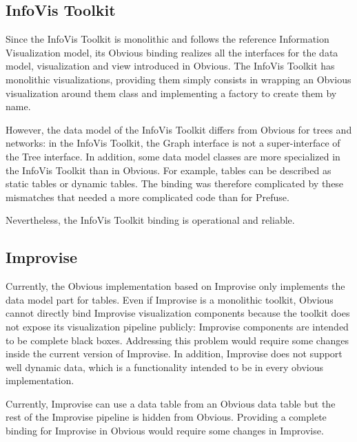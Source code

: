 
\subsection{InfoVis Toolkit}

Since the InfoVis Toolkit is monolithic and follows the reference
Information Visualization model, its Obvious binding realizes all the
interfaces for the data model, visualization and view introduced in
Obvious. The InfoVis Toolkit has monolithic visualizations, providing
them simply consists in wrapping an Obvious visualization around them
class and implementing a factory to create them by name.

However, the data model of the InfoVis Toolkit differs from Obvious
for trees and networks: in the InfoVis Toolkit, the Graph interface is
not a super-interface of the Tree interface.  In addition, some data
model classes are more specialized in the InfoVis Toolkit than in
Obvious.  For example, tables can be described as static tables or
dynamic tables.  The binding was therefore complicated by these
mismatches that needed a more complicated code than for Prefuse.

Nevertheless, the InfoVis Toolkit binding is operational and
reliable.


\subsection{Improvise}

Currently, the Obvious implementation based on Improvise only
implements the data model part for tables.  Even if Improvise is a
monolithic toolkit, Obvious cannot directly bind Improvise
visualization components because the toolkit does not expose its
visualization pipeline publicly: Improvise components are intended to
be complete black boxes.  Addressing this problem would require some
changes inside the current version of Improvise. In addition,
Improvise does not support well dynamic data, which is a functionality
intended to be in every obvious implementation.

Currently, Improvise can use a data table from an Obvious data table
but the rest of the Improvise pipeline is hidden from
Obvious. Providing a complete binding for Improvise in Obvious would
require some changes in Improvise.

